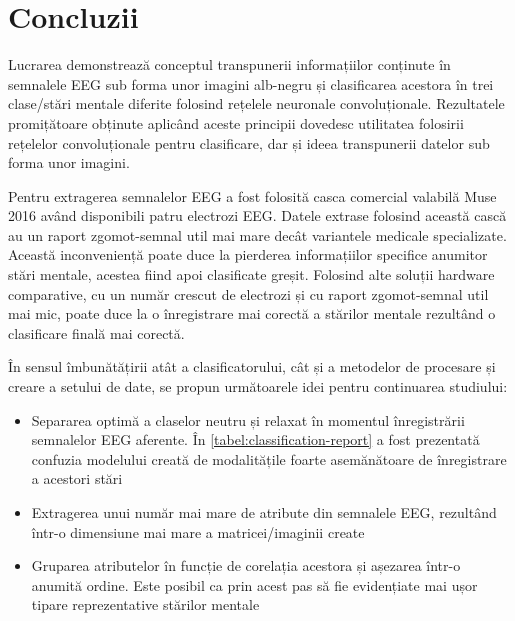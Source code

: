 \chapter{Concluzii}\label{ch:4concluzii}
Lucrarea demonstrează conceptul transpunerii informațiilor conținute în semnalele EEG sub forma unor imagini alb-negru și clasificarea acestora în trei clase/stări mentale diferite folosind rețelele neuronale convoluționale. Rezultatele promițătoare obținute aplicând aceste principii dovedesc utilitatea folosirii rețelelor convoluționale pentru clasificare, dar și ideea transpunerii datelor sub forma unor imagini.

Pentru extragerea semnalelor EEG a fost folosită casca comercial valabilă Muse 2016 având disponibili patru electrozi EEG. Datele extrase folosind această cască au un raport zgomot-semnal util mai mare decât variantele medicale specializate. Această inconveniență poate duce la pierderea informațiilor specifice anumitor stări mentale, acestea fiind apoi clasificate greșit. Folosind alte soluții hardware comparative, cu un număr crescut de electrozi și cu raport zgomot-semnal util mai mic, poate duce la o înregistrare mai corectă a stărilor mentale rezultând o clasificare finală mai corectă.

În sensul îmbunătățirii atât a clasificatorului, cât și a metodelor de procesare și creare a setului de date, se propun următoarele idei pentru continuarea studiului:
\begin{itemize}
\item Separarea optimă a claselor neutru și relaxat în momentul înregistrării semnalelor EEG aferente. În \autoref{tabel:classification-report} a fost prezentată confuzia modelului creată de modalitățile foarte asemănătoare de înregistrare a acestori stări
\item Extragerea unui număr mai mare de atribute din semnalele EEG, rezultând într-o dimensiune mai mare a matricei/imaginii create
\item Gruparea atributelor în funcție de corelația acestora și așezarea într-o anumită ordine. Este posibil ca prin acest pas să fie evidențiate mai ușor tipare reprezentative stărilor mentale
\end{itemize}